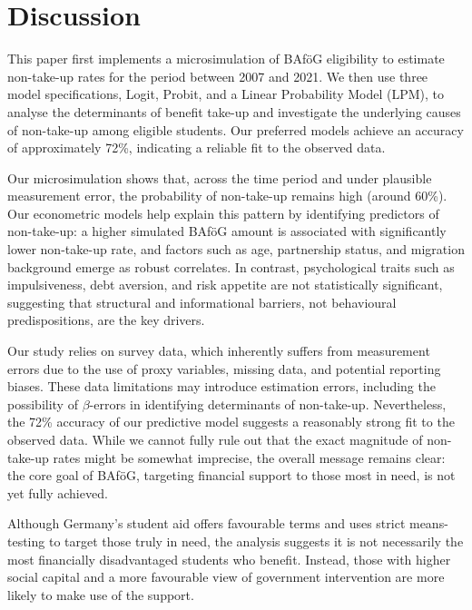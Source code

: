 \section{Discussion}


This paper first implements a microsimulation of BAföG eligibility to estimate non-take-up rates for the period between 2007 and 2021. 
We then use three model specifications, Logit, Probit, and a Linear Probability Model (LPM), to analyse the determinants of benefit take-up and investigate the underlying causes of non-take-up among eligible students. 
Our preferred models achieve an accuracy of approximately 72\%, indicating a reliable fit to the observed data.

Our microsimulation shows that, across the time period and under plausible measurement error, the probability of non-take-up remains high (around 60\%). 
Our econometric models help explain this pattern by identifying predictors of non-take-up: a higher simulated BAföG amount is associated with significantly lower non-take-up rate, and factors such as age, partnership status, and migration background emerge as robust correlates. 
In contrast, psychological traits such as impulsiveness, debt aversion, and risk appetite are not statistically significant, suggesting that structural and informational barriers, not behavioural predispositions, are the key drivers.

Our study relies on survey data, which inherently suffers from measurement errors due to the use of proxy variables, missing data, and potential reporting biases. 
These data limitations may introduce estimation errors, including the possibility of \( \beta \)-errors in identifying determinants of non-take-up. 
Nevertheless, the 72\% accuracy of our predictive model suggests a reasonably strong fit to the observed data. 
While we cannot fully rule out that the exact magnitude of non-take-up rates might be somewhat imprecise, the overall message remains clear: the core goal of BAföG, targeting financial support to those most in need, is not yet fully achieved.



Although Germany’s student aid offers favourable terms and uses strict means-testing to target those truly in need, the analysis suggests it is not necessarily the most financially disadvantaged students who benefit. 
Instead, those with higher social capital and a more favourable view of government intervention are more likely to make use of the support.

